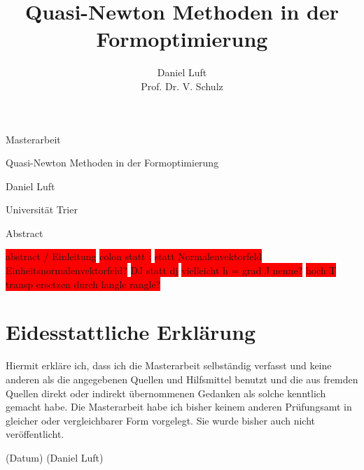 \documentclass[bibliography=totoc,12pt,a4paper]{scrartcl}
\theoremstyle{exampstyle}
\numberwithin{equation}{section}
\renewenvironment{abstract}
 {\small
  \begin{center}
  \bfseries \abstractname\vspace{-.5em}\vspace{0pt}
  \end{center}
  \list{}{%
    \setlength{\leftmargin}{12mm}%
    \setlength{\rightmargin}{\leftmargin}%
  }%
  \item\relax}
 {\endlist}
\begin{document}
\title{Quasi-Newton Methoden in der Formoptimierung}

\author{Daniel Luft \\ Prof. Dr. V. Schulz}

  \pagestyle{empty}

  \begin{titlepage}

    \vspace*{2cm} 

 \begin{center} \large 
    
    Masterarbeit
    \vspace*{2cm}

    {\huge Quasi-Newton Methoden in der Formoptimierung}
    \vspace*{2.5cm}

    Daniel Luft
    \vspace*{6cm}


	Universität Trier
  \end{center}
\end{titlepage}

  \tableofcontents

\newpage

  \pagestyle{headings}
  
\begin{abstract}
Abstract
\end{abstract}
\vspace{1cm}

\colorbox{red}{abstract / Einleitung}
\colorbox{red}{colon statt :}
\colorbox{red}{statt Normalenvektorfeld Einheitsnormalenvektorfeld?}
\colorbox{red}{DJ statt dj}
\colorbox{red}{vielleicht h = grad J nenne?}
\colorbox{red}{hoch T transp ersetzen durch langle rangle?}







\newpage
\appendix
\section{Eidesstattliche Erklärung}
Hiermit erkläre ich, dass ich die Masterarbeit selbständig verfasst und keine anderen als die angegebenen Quellen und Hilfsmittel benutzt und die aus fremden Quellen direkt oder indirekt übernommenen
Gedanken als solche kenntlich gemacht habe. Die Masterarbeit habe ich bisher keinem anderen Prüfungsamt in gleicher oder vergleichbarer Form vorgelegt. Sie wurde bisher auch nicht veröffentlicht.
\vspace{1.5cm}

(Datum) \hspace{9cm} (Daniel Luft)


\newpage
\nocite{*}


\end{document}
